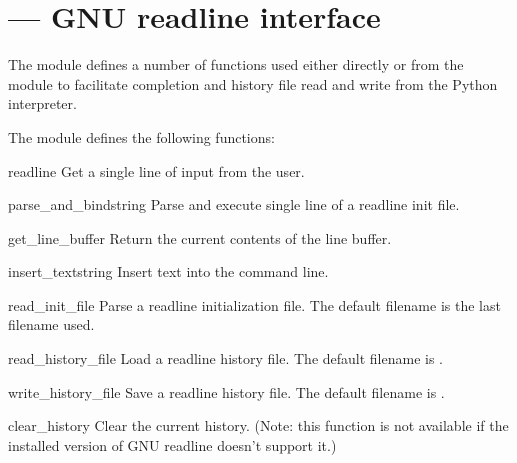 \section{ ---
         GNU readline interface}



The  module defines a number of functions used either
directly or from the  module to facilitate
completion and history file read and write from the Python
interpreter.

The  module defines the following functions:


\begin{funcdesc}{readline}{}
Get a single line of input from the user.
\end{funcdesc}

\begin{funcdesc}{parse_and_bind}{string}
Parse and execute single line of a readline init file.
\end{funcdesc}

\begin{funcdesc}{get_line_buffer}{}
Return the current contents of the line buffer.
\end{funcdesc}

\begin{funcdesc}{insert_text}{string}
Insert text into the command line.
\end{funcdesc}

\begin{funcdesc}{read_init_file}{}
Parse a readline initialization file.
The default filename is the last filename used.
\end{funcdesc}

\begin{funcdesc}{read_history_file}{}
Load a readline history file.
The default filename is .
\end{funcdesc}

\begin{funcdesc}{write_history_file}{}
Save a readline history file.
The default filename is .
\end{funcdesc}

\begin{funcdesc}{clear_history}{}
Clear the current history.  (Note: this function is not available if
the installed version of GNU readline doesn't support it.)
\end{funcdesc}

